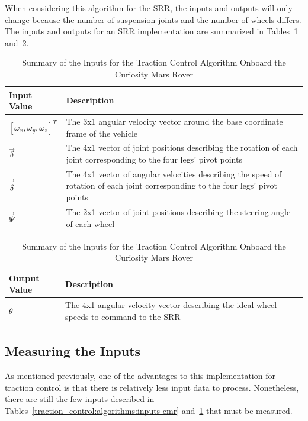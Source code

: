 When considering this algorithm for the \ac{SRR}, the inputs and outputs will only change because the number of suspension joints and the number of wheels differs. The inputs and outputs for an \ac{SRR} implementation are summarized in Tables~\ref{traction_control:algorithms:inputs-srr} and~\ref{traction_control:algorithms:outputs-srr}.

\begin{table}[H]
	\centering
	\begin{tabular}{| >{\centering\arraybackslash}m{1.2in} | >{\centering\arraybackslash}m{4.5in} |}
		\hline
		\textbf{Input Value} & \textbf{Description} \\
		\hline
		$\left[\omega_{x}, \omega_{y}, \omega_{z}\right]^{T}$ & The 3x1 angular velocity vector around the base coordinate frame of the vehicle \\
		\hline
		$\vec{\delta}$ & The 4x1 vector of joint positions describing the rotation of each joint corresponding to the four legs' pivot points \\
		\hline
		$\vec{\dot{\delta}}$ & The 4x1 vector of angular velocities describing the speed of rotation of each joint corresponding to the four legs' pivot points \\
		\hline
		$\vec{\Psi}$ & The 2x1 vector of joint positions describing the steering angle of each wheel \\
		\hline
	\end{tabular}
	\caption{Summary of the Inputs for the Traction Control Algorithm Onboard the Curiosity Mars Rover}
	\label{traction_control:algorithms:inputs-srr}
\end{table}

\begin{table}[H]
	\centering
	\begin{tabular}{| >{\centering\arraybackslash}m{1.2in} | >{\centering\arraybackslash}m{4.5in} |}
		\hline
		\textbf{Output Value} & \textbf{Description} \\
		\hline
		$\dot{\theta}$ & The 4x1 angular velocity vector describing the ideal wheel speeds to command to the \acl{SRR} \\
		\hline
	\end{tabular}
	\caption{Summary of the Inputs for the Traction Control Algorithm Onboard the Curiosity Mars Rover}
	\label{traction_control:algorithms:outputs-srr}
\end{table}

\subsection{Measuring the Inputs}
As mentioned previously, one of the advantages to this implementation for traction control is that there is relatively less input data to process. Nonetheless, there are still the few inputs described in Tables~\ref{traction_control:algorithms:inputs-cmr} and~\ref{traction_control:algorithms:inputs-srr} that must be measured. \\

